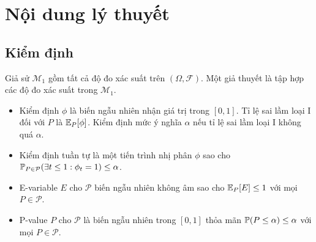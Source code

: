 \section{Nội dung lý thuyết}

\subsection{Kiểm định}

\begin{frame}
  \begin{defn}
    Giả sử $\mathcal{M}_1$ gồm tất cả độ đo xác suất trên $(\Omega,
    \mathcal{F})$. Một giả thuyết là tập hợp các độ đo xác suất trong
    $\mathcal{M}_1$.
  \end{defn}

  \begin{defn}
    \begin{itemize}
      \item Kiểm định $\phi$ là biến ngẫu nhiên nhận giá trị trong $[0, 1]$. Tỉ
        lệ sai lầm loại I đối với $P$ là $\operatorname{\mathbb{E}}_P[\phi]$. Kiểm định mức ý
        nghĩa $\alpha$ nếu tỉ lệ sai lầm loại I không quá $\alpha$.
      \item Kiểm định tuần tự là một tiến trình nhị phân $\phi$ sao cho
        $\operatorname{\mathbb{P}}_{P \in \mathcal{P}}(\exists t \le 1 : \phi_t  = 1) \le \alpha$.
    \end{itemize}
  \end{defn}

  \begin{defn}
    \begin{itemize}
      \item E-variable $E$ cho $\mathcal{P}$ biến ngẫu nhiên không âm sao cho
        $\operatorname{\mathbb{E}}_P[E] \le 1$ với mọi $P \in \mathcal{P}$.
      \item P-value $P$ cho $\mathcal{P}$ là biến ngẫu nhiên trong $[0, 1]$
        thỏa mãn $\operatorname{\mathbb{P}}(P \leq \alpha) \leq \alpha$ với mọi $P \in
        \mathcal{P}$.
    \end{itemize}
  \end{defn}

\end{frame}

